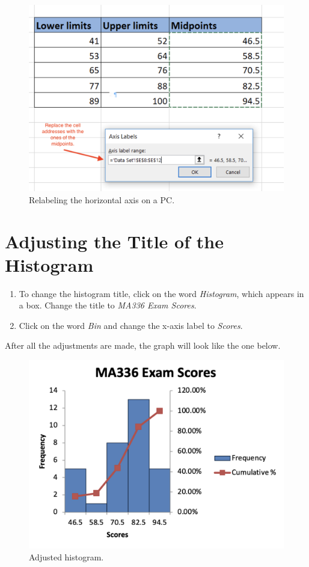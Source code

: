 \documentclass[
]{book}
\providecommand{\tightlist}{%
  \setlength{\itemsep}{0pt}\setlength{\parskip}{0pt}}
\begin{document}
\begin{figure}

{\centering \includegraphics[width=0.7\linewidth]{relabel-horiontal-axis-pc} 

}

\caption{Relabeling the horizontal axis on a PC.}\label{fig:relabel-horiontal-axis-pc}
\end{figure}

\hypertarget{adjusting-the-title-of-the-histogram}{%
\section{Adjusting the Title of the Histogram}\label{adjusting-the-title-of-the-histogram}}

\begin{enumerate}
\def\labelenumi{\arabic{enumi}.}
\tightlist
\item
  To change the histogram title, click on the word \emph{Histogram}, which appears
  in a box. Change the title to \emph{MA336 Exam Scores}.
\item
  Click on the word \emph{Bin} and change the x-axis label to \emph{Scores}.
\end{enumerate}

After all the adjustments are made, the graph will look like the one below.

\begin{figure}

{\centering \includegraphics[width=0.7\linewidth]{adjusted-histogram} 

}

\caption{Adjusted histogram.}\label{fig:adjusted-histogram}
\end{figure}
\end{document}
